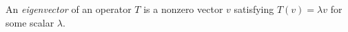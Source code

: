 
An \emph{eigenvector} of an operator $T$ is a nonzero vector $v$ satisfying $T(v)=\lambda v$ for some scalar $\lambda$.
